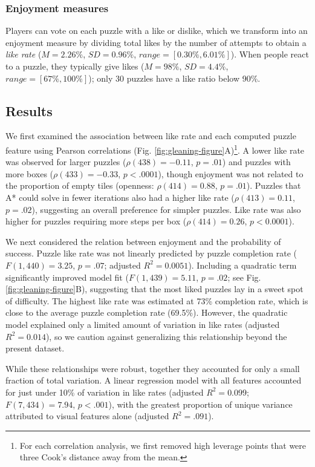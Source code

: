 \documentclass[10pt,letterpaper]{article}
\begin{document}
\subsubsection{Enjoyment measures}
Players can vote on each puzzle with a like or dislike, which we transform into an enjoyment measure by dividing total likes by the number of attempts to obtain a \textit{like rate} ($M =2.26\%$, $SD = 0.96\%$, $range =[0.30\%, 6.01\%]$).
When people react to a puzzle, they typically give likes ($M=98\%$, $SD=4.4\%$, $range = [67\%, 100\%]$); only 30 puzzles have a like ratio below 90\%. 

\subsection{Results}

We first examined the association between like rate and each computed puzzle feature using Pearson correlations (Fig. \ref{fig:gleaning-figure}A)\footnote{For each correlation analysis, we first removed high leverage points that were three Cook's distance away from the mean.}. 
A lower like rate was observed for larger puzzles ($\rho(438) =-0.11$, $p=.01$) and puzzles with more boxes ($\rho(433) = -0.33$, $p<.0001$), though enjoyment was not related to the proportion of empty tiles (openness: $\rho(414) = 0.88$, $p=.01$). 
Puzzles that A* could solve in fewer iterations also had a higher like rate ($\rho(413) = 0.11$, $p=.02$), suggesting an overall preference for simpler puzzles. 
Like rate was also higher for puzzles requiring more steps per box ($\rho(414) = 0.26$, $p<0.0001$). 

We next considered the relation between enjoyment and the probability of success. Puzzle like rate was not linearly predicted by puzzle completion rate ($F(1,440)=3.25$, $p=.07$; adjusted $R^{2}=0.0051$). %
Including a quadratic term significantly improved model fit ($F(1,439)=5.11$, $p=.02$; see Fig. \ref{fig:gleaning-figure}B), suggesting that the most liked puzzles lay in a sweet spot of difficulty. The highest like rate was estimated at 73\% completion rate, which is close to the average puzzle completion rate (69.5\%). However, the quadratic model explained only a limited amount of variation in like rates (adjusted $R^{2}=0.014$), so we caution against generalizing this relationship beyond the present dataset.

While these relationships were robust, together they accounted for only a small fraction of total variation. A linear regression model with all features accounted for just under 10\% of variation in like rates (adjusted $R^2= 0.099$; $F(7,434)=7.94$, $p<.001$), with the greatest proportion of unique variance attributed to visual features alone (adjusted $R^2=.091$).
\end{document}
